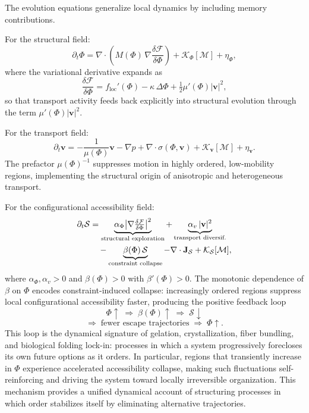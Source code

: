 \documentclass[11pt, a4paper, twocolumn]{article}
\newcommand{\Sfield}{\mathcal{S}}
\newcommand{\F}{\mathcal{F}}
\newcommand{\J}{\mathbf{J}}
\begin{document}
The evolution equations generalize local dynamics by including memory
contributions.

For the structural field:
\begin{equation}
    \partial_t \Phi
    =
    \nabla \cdot
    \left(
        M(\Phi)\,\nabla \frac{\delta \F}{\delta \Phi}
    \right)
    +
    \mathcal{K}_\Phi[\mathcal{M}]
    +
    \eta_\Phi,
    \label{eq:phi_evo}
\end{equation}
where the variational derivative expands as
\[
    \frac{\delta \F}{\delta \Phi}
    =
    f_{\mathrm{loc}}'(\Phi) - \kappa\,\Delta\Phi + \tfrac{1}{2}\mu'(\Phi)|\mathbf{v}|^2,
\]
so that transport activity feeds back explicitly into structural evolution
through the term $\mu'(\Phi)|\mathbf{v}|^2$.

For the transport field:
\begin{equation}
    \partial_t \mathbf{v}
    =
    -\frac{1}{\mu(\Phi)}\mathbf{v}
    - \nabla p
    + \nabla \cdot \sigma(\Phi,\mathbf{v})
    + \mathcal{K}_{\mathbf{v}}[\mathcal{M}]
    + \eta_{\mathbf{v}}.
    \label{eq:v_evo}
\end{equation}
The prefactor $\mu(\Phi)^{-1}$ suppresses motion in highly ordered, low-mobility
regions, implementing the structural origin of anisotropic and heterogeneous
transport.

For the configurational accessibility field:
\begin{align}
    \partial_t \Sfield
    &=
    \underbrace{\alpha_\Phi \bigl|\nabla \tfrac{\delta \F}{\delta \Phi}\bigr|^2}_{\text{structural exploration}}
    +
    \underbrace{\alpha_v\,|\mathbf{v}|^2}_{\text{transport diversif.}}
    \notag\\
    &\quad
    -
    \underbrace{\beta(\Phi)\,\Sfield}_{\text{constraint collapse}}
    -
    \nabla \cdot \J_{\Sfield}
    +
    \mathcal{K}_{\Sfield}[\mathcal{M}],
    \label{eq:S_evo}
\end{align}
where $\alpha_\Phi, \alpha_v > 0$ and $\beta(\Phi) > 0$ with $\beta'(\Phi) > 0$.
The monotonic dependence of $\beta$ on $\Phi$ encodes constraint-induced collapse:
increasingly ordered regions suppress local configurational accessibility faster,
producing the positive feedback loop
\[
    \Phi \uparrow \;\Rightarrow\; \beta(\Phi) \uparrow \;\Rightarrow\; \Sfield \downarrow
\]
\[
    \Rightarrow\; \text{fewer escape trajectories} \;\Rightarrow\; \Phi \uparrow.
\]
This loop is the dynamical signature of gelation, crystallization, fiber
bundling, and biological folding lock-in: processes in which a system
progressively forecloses its own future options as it orders. In particular,
regions that transiently increase in $\Phi$ experience accelerated accessibility
collapse, making such fluctuations self-reinforcing and driving the system
toward locally irreversible organization. This mechanism provides a unified
dynamical account of structuring processes in which order stabilizes itself
by eliminating alternative trajectories.
\end{document}
